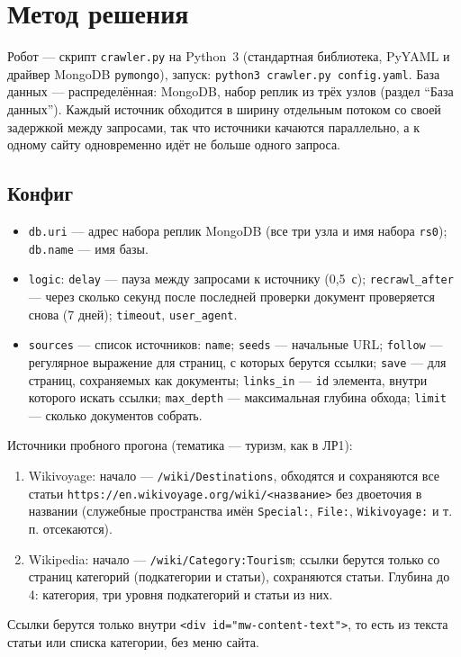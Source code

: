 \section{Метод решения}
Робот --- скрипт \texttt{crawler.py} на Python~3 (стандартная библиотека, PyYAML и драйвер MongoDB \texttt{pymongo}), запуск: \texttt{python3 crawler.py config.yaml}. База данных --- распределённая: MongoDB, набор реплик из трёх узлов (раздел \enquote{База данных}). Каждый источник обходится в ширину отдельным потоком со своей задержкой между запросами, так что источники качаются параллельно, а к одному сайту одновременно идёт не больше одного запроса.

\subsection{Конфиг}
\begin{itemize}
    \item \texttt{db.uri} --- адрес набора реплик MongoDB (все три узла и имя набора \texttt{rs0}); \texttt{db.name} --- имя базы.
    \item \texttt{logic}: \texttt{delay} --- пауза между запросами к источнику (0,5~с); \texttt{recrawl\_after} --- через сколько секунд после последней проверки документ проверяется снова (7 дней); \texttt{timeout}, \texttt{user\_agent}.
    \item \texttt{sources} --- список источников: \texttt{name}; \texttt{seeds} --- начальные URL; \texttt{follow} --- регулярное выражение для страниц, с которых берутся ссылки; \texttt{save} --- для страниц, сохраняемых как документы; \texttt{links\_in} --- \texttt{id} элемента, внутри которого искать ссылки; \texttt{max\_depth} --- максимальная глубина обхода; \texttt{limit} --- сколько документов собрать.
\end{itemize}

Источники пробного прогона (тематика --- туризм, как в ЛР1):
\begin{enumerate}
    \item Wikivoyage: начало --- \texttt{/wiki/Destinations}, обходятся и сохраняются все статьи \texttt{https://en.wikivoyage.org/wiki/<название>} без двоеточия в названии (служебные пространства имён \texttt{Special:}, \texttt{File:}, \texttt{Wikivoyage:} и т.\,п. отсекаются).
    \item Wikipedia: начало --- \texttt{/wiki/Category:Tourism}; ссылки берутся только со страниц категорий (подкатегории и статьи), сохраняются статьи. Глубина до 4: категория, три уровня подкатегорий и статьи из них.
\end{enumerate}
Ссылки берутся только внутри \texttt{<div id="mw-content-text">}, то есть из текста статьи или списка категории, без меню сайта.

